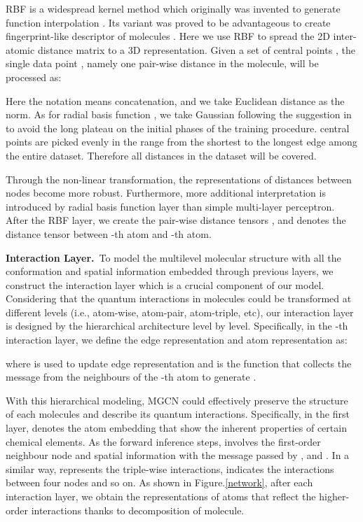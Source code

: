\documentclass[letterpaper]{article} \usepackage{bm}
\begin{document}
RBF is a widespread kernel method which originally was invented to generate function interpolation \cite{broomhead1988radial}. Its variant was proved to be advantageous to create fingerprint-like descriptor of molecules \cite{Li2018DeeperII}. Here we use RBF to spread the 2D inter-atomic distance matrix to a 3D representation. Given a set of  central points , the single data point , namely one pair-wise distance in the molecule, will be processed as:   

  


\noindent Here the notation  means concatenation, and we take Euclidean distance as the norm. As for radial basis function , we take Gaussian  following the suggestion in \cite{schutt2017schnet} to avoid the long plateau on the initial phases of the training procedure.  central points are picked evenly in the range from the shortest to the longest edge among the entire dataset. Therefore all distances in the dataset will be covered. 

Through the non-linear transformation, the representations of distances between nodes become more robust. Furthermore, more additional interpretation is introduced by radial basis function layer than simple multi-layer perceptron. After the RBF layer, we create the pair-wise distance tensors , and  denotes the distance tensor between -th atom and -th atom.



\textbf{Interaction Layer.}\ To model the multilevel molecular structure with all the conformation and spatial information embedded through previous layers, we construct the interaction layer which is a crucial component of our model. Considering that the quantum interactions in molecules could be transformed at different levels (i.e., atom-wise, atom-pair, atom-triple, etc), our interaction layer is designed by the hierarchical architecture level by level. Specifically, in the -th interaction layer, we define the edge representation  and atom representation  as:
    
     
where  is used to update edge representation and  is the function that collects the message from the neighbours of the -th atom to generate . 

With this hierarchical modeling, MGCN could effectively preserve the structure of each molecules and describe its quantum interactions. Specifically, in the first layer,  denotes the atom embedding that show the inherent properties of certain chemical elements. As the forward inference steps,  involves the first-order neighbour node and spatial information with the message passed by ,  and . In a similar way,  represents the triple-wise interactions,  indicates the interactions between four nodes and so on. As shown in Figure.\ref{network}, after each interaction layer, we obtain the representations of atoms that reflect the higher-order interactions thanks to decomposition of molecule. 
\end{document}
